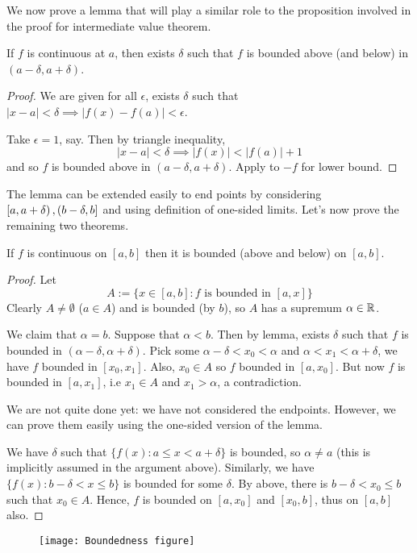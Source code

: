 \documentclass[11pt]{article}
\begin{document}
We now prove a lemma that will play a similar role to the proposition involved in the proof for intermediate value theorem.
\begin{lemma}
  If \(f\) is continuous at \(a\), then exists \(\delta\) such that \(f\) is bounded above (and below) in \((a-\delta,a+\delta)\). 
\end{lemma}
\begin{proof}
  We are given for all \(\epsilon\), exists \(\delta\) such that \(|x-a|<\delta\implies |f(x)-f(a)|<\epsilon\).

  Take \(\epsilon=1\), say. Then by triangle inequality,
  \[|x-a|<\delta\implies |f(x)|<|f(a)|+1\] 
  and so \(f\) is bounded above in \((a-\delta,a+\delta)\). Apply to \(-f\) for lower bound.
\end{proof}

The lemma can be extended easily to end points by considering \(\left[a,a+\delta\right),\left(b-\delta,b\right]\) and using definition of one-sided limits. Let's now prove the remaining two theorems.
\begin{theorem}
  If \(f\) is continuous on \([a,b]\) then it is bounded (above and below) on \([a,b]\).
\end{theorem}
\begin{proof}
  Let \[A:=\{x\in[a,b]:f\text{ is bounded in }[a,x]\}\]
  Clearly \(A\neq\emptyset\) (\(a\in A\)) and is bounded (by \(b\)), so \(A\) has a supremum \(\alpha\in\mathbb{R}\). 
  
  We claim that \(\alpha = b\). Suppose that \(\alpha<b\). Then by lemma, exists \(\delta\) such that \(f\) is bounded in \((\alpha-\delta,\alpha+\delta)\). Pick some \(\alpha-\delta<x_0<\alpha\) and \(\alpha<x_1<\alpha+\delta\), we have \(f\) bounded in \([x_0,x_1]\). Also, \(x_0\in A\) so \(f\) bounded in \([a,x_0]\). But now \(f\) is bounded in \([a,x_1]\), i.e \(x_1\in A\) and \(x_1>\alpha\), a contradiction.

  We are not quite done yet: we have not considered the endpoints. However, we can prove them easily using the one-sided version of the lemma.

  We have \(\delta\) such that \(\{f(x):a\leq x <a+\delta\}\) is bounded, so \(\alpha\neq a\) (this is implicitly assumed in the argument above). Similarly, we have \(\{f(x):b-\delta<x\leq b\}\) is bounded for some \(\delta\). By above, there is \(b-\delta<x_0\leq b\) such that \(x_0\in A\). Hence, \(f\) is bounded on \([a,x_0]\) and \([x_0,b]\), thus on \([a,b]\) also.
\end{proof}
\begin{figure}[ht]
  \centering
  \texttt{[image: Boundedness figure]}
  \caption{}
\end{figure}
\end{document}
